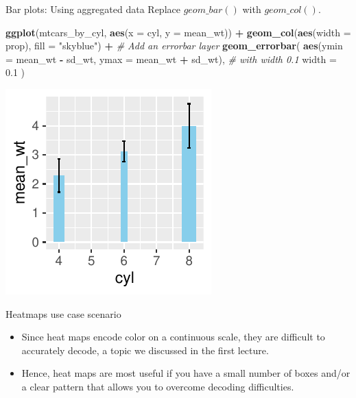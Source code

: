 \documentclass[
  ignorenonframetext,
]{beamer}
\newenvironment{Shaded}{\begin{snugshade}}{\end{snugshade}}
\newcommand{\AttributeTok}[1]{\textcolor[rgb]{0.13,0.29,0.53}{#1}}
\newcommand{\CommentTok}[1]{\textcolor[rgb]{0.56,0.35,0.01}{\textit{#1}}}
\newcommand{\FloatTok}[1]{\textcolor[rgb]{0.00,0.00,0.81}{#1}}
\newcommand{\FunctionTok}[1]{\textcolor[rgb]{0.13,0.29,0.53}{\textbf{#1}}}
\newcommand{\NormalTok}[1]{#1}
\newcommand{\SpecialCharTok}[1]{\textcolor[rgb]{0.81,0.36,0.00}{\textbf{#1}}}
\newcommand{\StringTok}[1]{\textcolor[rgb]{0.31,0.60,0.02}{#1}}
\begin{document}
\begin{frame}[fragile]{Bar plots: Using aggregated data}
\label{bar-plots-using-aggregated-data-8}
Replace \(geom\_bar()\) with \(geom\_col()\).


\begin{Shaded}
\begin{Highlighting}[]
\FunctionTok{ggplot}\NormalTok{(mtcars\_by\_cyl, }\FunctionTok{aes}\NormalTok{(}\AttributeTok{x =}\NormalTok{ cyl, }\AttributeTok{y =}\NormalTok{ mean\_wt)) }\SpecialCharTok{+}
  \FunctionTok{geom\_col}\NormalTok{(}\FunctionTok{aes}\NormalTok{(}\AttributeTok{width =}\NormalTok{ prop), }\AttributeTok{fill =} \StringTok{"skyblue"}\NormalTok{) }\SpecialCharTok{+}
  \CommentTok{\# Add an errorbar layer}
  \FunctionTok{geom\_errorbar}\NormalTok{(}
    \FunctionTok{aes}\NormalTok{(}\AttributeTok{ymin =}\NormalTok{ mean\_wt }\SpecialCharTok{{-}}\NormalTok{ sd\_wt, }\AttributeTok{ymax =}\NormalTok{ mean\_wt }\SpecialCharTok{+}\NormalTok{ sd\_wt),}
    \CommentTok{\# with width 0.1}
    \AttributeTok{width =} \FloatTok{0.1}
\NormalTok{  )}
\end{Highlighting}
\end{Shaded}

\begin{center}\includegraphics[width=0.5\linewidth]{Figs/unnamed-chunk-112-1} \end{center}
\end{frame}

\begin{frame}{Heatmaps use case scenario}
\label{heatmaps-use-case-scenario}
\begin{itemize}
\item
  Since heat maps encode color on a continuous scale, they are difficult
  to accurately decode, a topic we discussed in the first lecture.
\item
  Hence, heat maps are most useful if you have a small number of boxes
  and/or a clear pattern that allows you to overcome decoding
  difficulties.
\end{itemize}
\end{frame}
\end{document}
